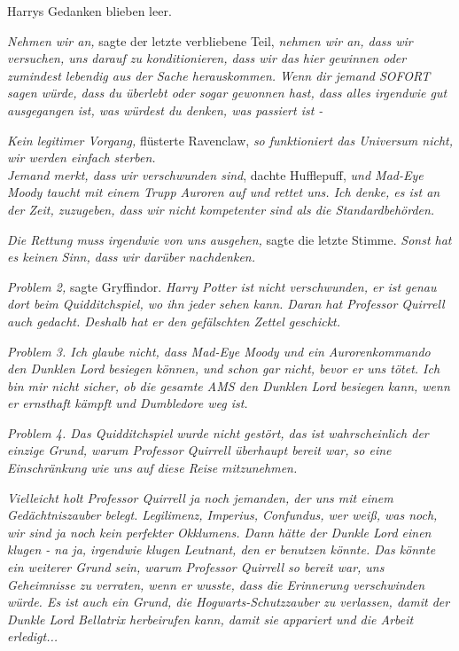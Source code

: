 {Harrys Gedanken blieben leer.

\emph{Nehmen wir an,} sagte der letzte verbliebene Teil, \emph{nehmen wir an, dass wir versuchen, uns darauf zu konditionieren, dass wir das hier gewinnen oder zumindest lebendig aus der Sache herauskommen. Wenn dir jemand SOFORT sagen würde, dass du überlebt oder sogar gewonnen hast, dass alles irgendwie gut ausgegangen ist, was würdest du denken, was passiert ist -}

\emph{Kein legitimer Vorgang,} flüsterte Ravenclaw, \emph{so funktioniert das Universum nicht, wir werden einfach sterben.}\\ \emph{\hfill\break Jemand merkt, dass wir verschwunden sind}, dachte Hufflepuff, \emph{und Mad-Eye}\\ \emph{Moody taucht mit einem Trupp Auroren auf und rettet uns. Ich denke, es ist an der Zeit, zuzugeben, dass wir nicht kompetenter sind als die Standardbehörden.}

\emph{Die Rettung muss irgendwie von uns ausgehen,} sagte die letzte Stimme. \emph{Sonst hat es keinen Sinn, dass wir darüber nachdenken.}

\emph{Problem 2,} sagte Gryffindor. \emph{Harry Potter ist nicht verschwunden, er ist genau dort beim Quidditchspiel, wo ihn jeder sehen kann. Daran hat Professor Quirrell auch gedacht. Deshalb hat er den gefälschten Zettel geschickt.}

\emph{Problem 3. Ich glaube nicht, dass Mad-Eye Moody und ein Aurorenkommando den Dunklen Lord besiegen können, und schon gar nicht, bevor er uns tötet. Ich bin mir nicht sicher, ob die gesamte AMS den Dunklen Lord besiegen kann, wenn er ernsthaft kämpft und Dumbledore weg ist.}

\emph{Problem 4. Das Quidditchspiel wurde nicht gestört, das ist wahrscheinlich der einzige Grund, warum Professor Quirrell überhaupt bereit war, so eine Einschränkung wie uns auf diese Reise mitzunehmen.}

\emph{Vielleicht holt Professor Quirrell ja noch jemanden, der uns mit einem Gedächtniszauber belegt. Legilimenz, Imperius, Confundus, wer weiß, was noch, wir sind ja noch kein perfekter Okklumens. Dann hätte der Dunkle Lord einen klugen - na ja, irgendwie klugen Leutnant, den er benutzen könnte. Das könnte ein weiterer Grund sein, warum Professor Quirrell so bereit war, uns Geheimnisse zu verraten, wenn er wusste, dass die Erinnerung verschwinden würde. Es ist auch ein Grund, die Hogwarts-Schutzzauber zu verlassen, damit der Dunkle Lord Bellatrix herbeirufen kann, damit sie appariert und die Arbeit erledigt...}

}
